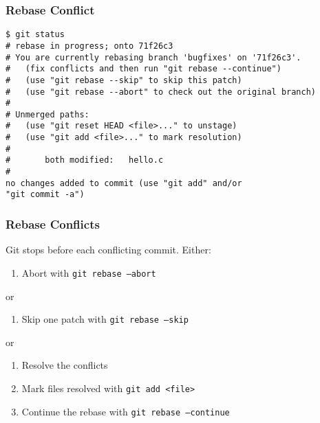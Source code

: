 \begin{frame}[fragile]
    \frametitle{Rebase Conflict}
    \footnotesize
    \begin{verbatim}
$ git status
# rebase in progress; onto 71f26c3
# You are currently rebasing branch 'bugfixes' on '71f26c3'.
#   (fix conflicts and then run "git rebase --continue")
#   (use "git rebase --skip" to skip this patch)
#   (use "git rebase --abort" to check out the original branch)
#
# Unmerged paths:
#   (use "git reset HEAD <file>..." to unstage)
#   (use "git add <file>..." to mark resolution)
#
#       both modified:   hello.c
#
no changes added to commit (use "git add" and/or
"git commit -a")
    \end{verbatim}
\end{frame}

\begin{frame}
    \frametitle{Rebase Conflicts}
    Git stops before each conflicting commit. Either:
    \medskip
    \begin{enumerate}[1.]
        \item Abort with \texttt{git rebase --abort}
    \end{enumerate}
    \medskip
    or
    \medskip
    \begin{enumerate}[1.]
        \item Skip one patch with \texttt{git rebase --skip}
    \end{enumerate}
    \medskip
    or
    \medskip
    \begin{enumerate}[1.]
        \item Resolve the conflicts
        \item Mark files resolved with \texttt{git add <file>}
        \item Continue the rebase with \texttt{git rebase --continue}
    \end{enumerate}
\end{frame}


